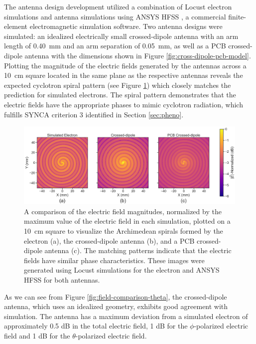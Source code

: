 The antenna design development utilized a combination of Locust electron simulations and antenna simulations using ANSYS HFSS \cite{hfss}, a commercial finite-element electromagnetic simulation software. Two antenna designs were simulated: an idealized electrically small crossed-dipole antenna with an arm length of 0.40~mm and an arm separation of 0.05~mm, as well as a PCB crossed-dipole antenna with the dimensions shown in Figure \ref{fig:cross-dipole-pcb-model}. Plotting the magnitude of the electric fields generated by the antennas across a 10~cm square located in the same plane as the respective antennas reveals the expected cyclotron spiral pattern (see Figure \ref{fig:spiral-comparison}) which closely matches the prediction for simulated electrons. The spiral pattern demonstrates that the electric fields have the appropriate phases to mimic cyclotron radiation, which fulfills SYNCA criterion 3 identified in Section \ref{sec:pheno}.
\begin{figure}[h]
    \centering
    \includegraphics[width=1.\textwidth]{figs/Chapter-5/220812_compare_spirals.png}
    \caption{A comparison of the electric field magnitudes, normalized by the maximum value of the electric field in each simulation, plotted on a 10~cm square to visualize the Archimedean spirals formed by the electron (a), the crossed-dipole antenna (b), and a PCB crossed-dipole antenna (c). The matching patterns indicate that the electric fields have similar phase characteristics. These images were generated using Locust simulations for the electron and ANSYS HFSS for both antennas.}
    \label{fig:spiral-comparison}
\end{figure}

As we can see from Figure \ref{fig:field-comparison-theta}, the crossed-dipole antenna, which uses an idealized geometry, exhibits good agreement with simulation. The antenna has a maximum deviation from a simulated electron of approximately 0.5 dB in the total electric field, 1 dB for the $\phi$-polarized electric field and 1 dB for the $\theta$-polarized electric field.

